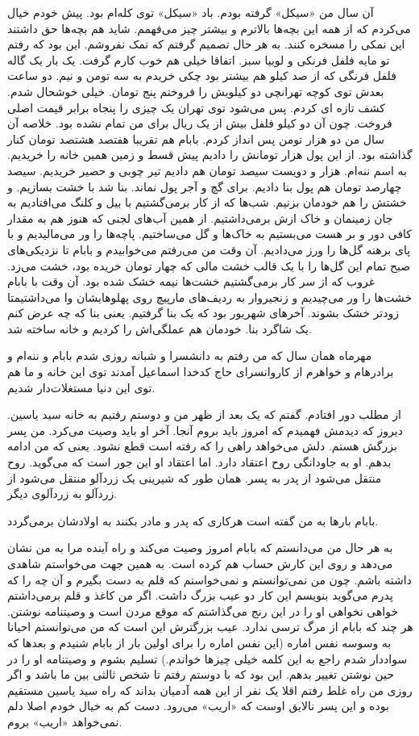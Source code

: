 \documentclass[12pt,a4paper]{book}
\begin{document}
آن سال من «سیکل» گرفته بودم. باد «سیکل» توی کله‌ام بود. پیش خودم خیال می‌کردم که از همه این بچه‌ها بالاترم و بیشتر چیز می‌فهمم. شاید هم بچه‌ها حق داشتند این نمکی را مسخره کنند. به هر حال تصمیم گرفتم که نمک نفروشم. این بود که رفتم تو مایه فلفل فرنکی و لوبیا سبز. اتفاقا خیلی هم خوب کارم گرفت. یک بار یک گاله فلفل فرنگی که از صد کیلو هم بیشتر بود چکی خریدم به سه تومن و نیم. دو ساعت بعدش توی کوچه تهرانچی دو کیلویش را فروختم پنج تومان. خیلی خوشحال شدم. کشف تازه ای کردم. پس می‌شود توی تهران یک چیزی را پنجاه برابر قیمت اصلی فروخت. چون آن دو کیلو فلفل بیش از یک ریال برای من تمام نشده بود. خلاصه آن 
سال من دو هزار تومن پس انداز کردم. بابام هم تقریبا هفتصد هشتصد تومان کنار گذاشته بود. از این پول‌ هزار تومانش را دادیم پیش قسط و زمین همین خانه را خریدیم. به اسم ننه‌ام. هزار و دویست سیصد تومان هم دادیم تیر چوبی و حصیر خریدیم. سیصد چهارصد تومان هم پول بنا دادیم. برای گچ و آجر پول نماند. بنا شد با خشت بسازیم. و خشتش را هم خودمان بزنیم. شب‌ها که از کار برمی‌گشتیم با بیل و کلنگ می‌افتادیم به جان زمینمان و خاک ازش برمی‌داشتیم. از همین آب‌های لجنی که هنوز هم به مقدار کافی دور و بر هست می‌بستیم به خاک‌ها و گل می‌ساختیم. پاچه‌ها را ور می‌مالیدیم و با پای برهنه گل‌ها را ورز می‌دادیم. آن وقت من می‌رفتم می‌خوابیدم و بابام تا نزدیکی‌های صبح تمام این گل‌ها را با یک قالب خشت مالی که چهار تومان خریده بود، خشت می‌زد. غروب که از سر کار بر‌می‌گشتیم خشت‌ها نیمه خشک شده بود. آن وقت با بابام خشت‌ها را ور می‌چیدیم و زنجیروار به ردیف‌های مارپیچ روی پهلوهایشان وا می‌داشتیمتا زودتر خشک بشوند. آخرهای شهریور بود که یک بنا گرفتیم. یعنی بنا که چه عرض کنم یک شاگرد بنا. خودمان هم عملگی‌اش را کردیم و خانه ساخته شد.

مهرماه همان سال که من رفتم به دانشسرا و شبانه روزی شدم بابام و ننه‌ام و برادرهام و خواهرم از کاروانسرای حاج کدخدا اسماعیل آمدند توی این خانه و ما هم توی این دنیا مستغلات‌دار شدیم.

از مطلب دور افتادم. گفتم که یک بعد از ظهر من و دوستم رفتیم به خانه سید یاسین. دیروز که دیدمش فهمیدم که امروز باید بروم آنجا. آخر او باید وصیت می‌کرد. من پسر بزرگش هستم. دلش می‌خواهد راهی را که رفته است قطع نشود. یعنی که من ادامه بدهم. او به جاودانگی روح اعتقاد دارد. اما اعتقاد او این جور است که می‌گوید. روح منتقل می‌شود از پدر به پسر. همان طور که شیرینی یک زردآلو منتقل می‌شود از زردآلو به زردآلوی دیگر.

بابام بارها به من گفته است هرکاری که پدر و مادر بکنند به اولادشان برمی‌گردد.

به هر حال من می‌دانستم که بابام امروز وصیت می‌کند و راه آینده مرا به من نشان می‌دهد و روی این کارش حساب هم کرده است. به همین جهت می‌خواستم شاهدی داشته باشم. چون من نمی‌توانستم و نمی‌خواستم که قلم به دست بگیرم و آن چه را که پدرم می‌گوید بنویسم این کار دو عیب بزرگ داشت. اگر من کاغذ و قلم برمی‌داشتم خواهی نخواهی او را در این رنج می‌گذاشتم که موقع مردن است و وصیتنامه نوشتن. هر چند که بابام از مرگ ترسی ندارد. عیب بزرگترش این است که من می‌توانستم احیانا به وسوسه نفس اماره (این نفس اماره را برای اولین بار از بابام شنیدم و بعدها که سواددار شدم راجع به این کلمه خیلی چیزها خواندم.) تسلیم بشوم و وصیتنامه او را در حین نوشتن تغییر بدهم. این بود که با دوستم رفتم تا شخص ثالثی بین ما باشد و اگر روزی من راه غلط رفتم اقلا یک نفر از این همه آدمیان بداند که راه سید یاسین مستقیم بوده و این پسر نالایق اوست که «اریب» می‌رود. دست کم به خیال خودم اصلا 
دلم نمی‌خواهد «اریب» بروم.
\end{document}
